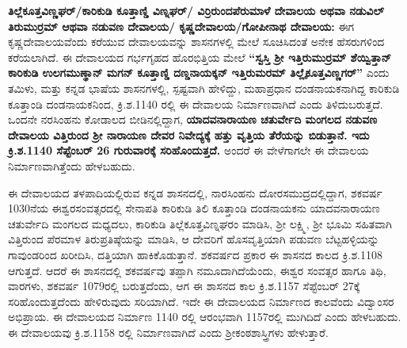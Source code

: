 \textbf{ತಿಲ್ಲೆಕೂತ್ತವಿಣ್ಣಘರ್​/ಕಾರಿಕುಡಿ ಕೂತ್ತಾಣ್ಡಿ ವಿಣ್ನಘರ್​/ ವಿರ್ರಿರುಂದಪೆರುಮಾಳೆ ದೇವಾಲಯ ಅಥವಾ ನಡುವಿಲ್​ ತಿರುಮುರ್ರಮ್ ಆಥವಾ ನಡುವಣ ದೇವಾಲಯ/ ಕೃಷ್ಣದೇವಾಲಯ/ಗೋಪೀನಾಥ ದೇವಾಲಯ:} ಈಗ ಕೃಷ್ಣದೇವಾಲಯ\-ವೆಂದು ಕರೆಯುವ ದೇವಾಲಯವನ್ನು ಶಾಸನಗಳಲ್ಲಿ ಮೇಲೆ ಸೂಚಿಸಿದಂತೆ ಅನೇಕ ಹೆಸರುಗಳಿಂದ ಕರೆಯಲಾಗಿದೆ. ಈ ದೇವಾಲಯದ ಗರ್ಭಗೃಹದ ಹೊರಭಿತ್ತಿಯ ಮೇಲೆ \textbf{“ಸ್ವಸ್ತಿ ಶ‍್ರೀ ಇತ್ತಿರುಮುರ್ರಮ್ ಶೆಯ್ವಿತ್ತಾನ್​ ಕಾರಿಕುಡಿ ಉಲಗಮುಣ್ಢಾನ್​ ಮಗನ್​ ಕೂತ್ತಾಣ್ಡಿ ದಣ್ಡನಾಯಕ್ಕನ್​ ಇತ್ತಿರುಮರಮ್ ತಿಲ್ಲೈಕೂತ್ತವಿಣ್ಣಗರ್​”} ಎಂದು ತಮಿಳು, ಮತ್ತು ಕನ್ನಡ ಭಾಷೆಯ ಶಾಸನಗಳಲ್ಲಿ, ಸ್ಪಷ್ಟವಾಗಿ ಹೇಳಿದ್ದು, ಮಹಾಪ್ರಧಾನ ದಂಡನಾಯಕನಾಗಿದ್ದ ಕಾರಿಕುಡಿ ಕೂತ್ತಾಂಡಿ ದಂಡನಾಯಕನಿಂದ, ಕ್ರಿ.ಶ.1140 ರಲ್ಲಿ ಈ ದೇವಾಲಯ ನಿರ್ಮಾಣವಾಗಿದೆ ಎಂದು ತಿಳಿದುಬರುತ್ತದೆ. ಒಂದನೇ ನರಸಿಂಹನು ಕೋಡಾಲದ ಬೀಡಿನಲ್ಲಿದ್ದಾಗ, \textbf{ಯಾದವನಾರಾಯಣ ಚತುರ್ವೇದಿ ಮಂಗಲದ ನಡುವಣ ದೇವಾಲಯ ವಿತ್ತಿರುಂದ ಶ‍್ರೀ ನಾರಾಯಣ ದೇವರ ನಿವೇದ್ಯಕ್ಕೆ ಹತ್ತು ವೃತ್ತಿಯ ತೆರೆಯನ್ನು ಬಿಡುತ್ತಾನೆ. ಇದು ಕ್ರಿ.ಶ.1140 ಸೆಪ್ಟೆಂಬರ್​ 26 ಗುರುವಾರಕ್ಕೆ ಸರಿಹೊಂದುತ್ತದೆ.} ಅಂದರೆ ಈ ವೇಳೆಗಾಗಲೇ ಈ ದೇವಾಲಯ ನಿರ್ಮಾಣವಾಗಿತ್ತೆಂದು ಹೇಳಬಹುದು.

ಈ ದೇವಾಲಯದ ತಳಪಾದಿಯಲ್ಲಿರುವ ಕನ್ನಡ ಶಾಸನದಲ್ಲಿ, ನಾರಸಿಂಹನು ದೋರಸಮುದ್ರದಲ್ಲಿದ್ದಾಗ, ಶಕವರ್ಷ 1030ನೆಯ ಈಶ್ವರಸಂವತ್ಸರದಲ್ಲಿ ಸೇನಾಪತಿ ಕಾರಿಕುಡಿ ತಿಲಿ ಕೂತ್ತಾಂಡಿ ದಂಡನಾಯಕನು ಯಾದವನಾರಾಯಣ ಚತುರ್ವೇದಿ ಮಂಗಲದ ಮಧ್ಯದಲು, ಕಾರಿಕುಡಿ ತಿಲ್ಲೆಕೂತ್ತವಿಣ್ನಘರಂ ಮಾಡಿಸಿ, ಶ‍್ರೀ ಲಕ್ಷ್ಮಿ, ಶ‍್ರೀ ಭೂಮಿ ಸಹಿತವಾಗಿ ವಿತ್ತಿರುಂದ ಪೆರಮಾಳ ತಿರುಪ್ರತಿಷ್ಠೆಯನ್ನು ಮಾಡಿಸಿ, ಆ ದೇವರಿಗೆ ಹೊಸವೃತ್ತಿಯಾಗಿ ಪಡುವಣ ಬೆಟ್ಟಹಳ್ಳಿಯನ್ನು ಗಾವುಂಡರಿಂದ ಖರೀದಿಸಿ, ದತ್ತಿಯಾಗಿ ಹಾಕಿಕೊಡುತ್ತಾನೆ. ಶಕವರ್ಷದ ಪ್ರಕಾರ ಈ ಶಾಸನದ ಕಾಲದ ಕ್ರಿ.ಶ.1108 ಆಗುತ್ತದೆ. ಆದರೆ ಈ ಶಾಸನದಲ್ಲಿ ಶಕವರ್ಷವು ತಪ್ಪಾಗಿ ನಮೂದಾಗಿದೆಯೆಂದು, ಈಶ್ವರ ಸಂವತ್ಸರ ಹಾಗೂ ತಿಥಿ, ವಾರಗಳು, ಶಕವರ್ಷ 1079ರಲ್ಲಿ ಬರುತ್ತದೆಂದು, ಆಗ ಈ ಶಾಸನದ ಕಾಲ ಕ್ರಿ.ಶ.1157 ಸೆಪ್ಟೆಂಬರ್​ 27ಕ್ಕೆ ಸರಿಹೊಂದುತ್ತದೆಂದು ಹೇಳಿರುವುದು ಸರಿಯಾಗಿದೆ. ಇದೇ ಈ ದೇವಾಲಯದ ನಿರ್ಮಾಣದ ಕಾಲವೆಂದು ವಿದ್ವಾಂಸರ ಅಭಿಪ್ರಾಯ. ಈ ದೇವಾಲಯದ ನಿರ್ಮಾಣ 1140 ರಲ್ಲಿ ಆರಂಭವಾಗಿ 1157ರಲ್ಲಿ ಮುಗಿದಿದೆ ಎಂದು ಹೇಳಬಹುದು. ಈ ದೇವಾಲಯವು ಕ್ರಿ.ಶ.1158 ರಲ್ಲಿ ನಿರ್ಮಾಣವಾಗಿದೆ ಎಂದು ಶ‍್ರೀಕಂಠಶಾಸ್ತ್ರಿಗಳು ಹೇಳುತ್ತಾರೆ.

